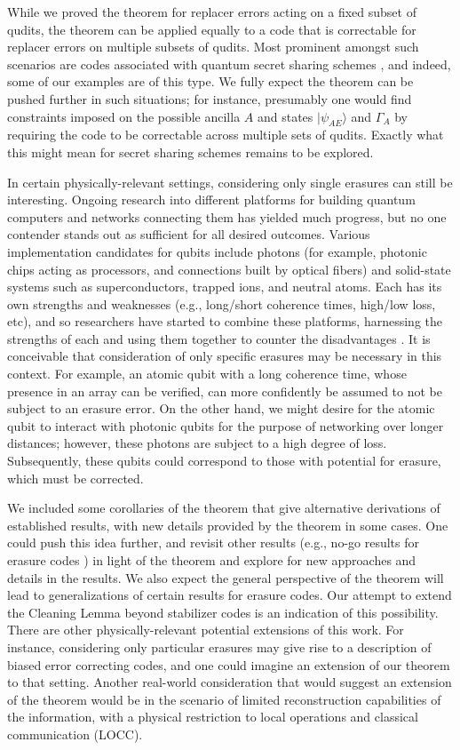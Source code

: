 \documentclass[11pt]{amsart}
\theoremstyle{definition}
\theoremstyle{definition}
\theoremstyle{definition}
\newcommand{\1}{\mathbb{I}}
\def\ket#1{| #1 \rangle}
\begin{document}
While we proved the theorem for replacer errors acting on a fixed subset of qudits, the theorem can be applied equally to a code that is correctable for replacer errors on multiple subsets of qudits. Most prominent amongst such scenarios are codes associated with quantum secret sharing schemes \cite{cleve1999share}, and indeed, some of our examples are of this type. 
We fully expect the theorem can be pushed further in such situations; for instance, presumably one would find constraints imposed on the possible ancilla $A$ and states $\ket{\psi_{AE}}$ and $\Gamma_A$ by requiring the code to be correctable across multiple sets of qudits. Exactly what this might mean for secret sharing schemes remains to be explored.    

In certain physically-relevant settings, considering only single erasures can still be interesting.
Ongoing research into different platforms for building quantum computers and networks connecting them has yielded much progress, but no one contender stands out as sufficient for all
desired outcomes.
Various implementation candidates for qubits include photons (for example, photonic chips acting as processors, and connections built by optical fibers) and solid-state systems such as superconductors, trapped ions, and neutral atoms.
Each has its own strengths and weaknesses (e.g., long/short coherence times, high/low loss, etc), and so researchers have started to combine these platforms, harnessing the strengths of each and using them together to counter the disadvantages \cite{Awshalometal21,Elshaarietal20,Chiaetal24}.
It is conceivable that consideration of only specific erasures may be necessary in this context.
For example, an atomic qubit with a long coherence time, whose presence in an array can be verified, can more confidently be assumed to not be subject to an erasure error.
On the other hand, we might desire for the atomic qubit to interact
with photonic qubits for the purpose of networking over longer distances; however, these photons are subject to a high degree of loss. Subsequently, these qubits could correspond to those with
potential for erasure, which must be corrected.

We included some corollaries of the theorem that give alternative derivations of established results, with new details provided by the theorem in some cases. One could push this idea further, and revisit other results (e.g., no-go results for erasure codes \cite{grassl1997codes}) in light of the theorem and explore for new approaches and details in the results. We also expect the general perspective of the theorem will lead to generalizations of certain results for erasure codes. Our attempt to extend the Cleaning Lemma \cite{Rai98,BT09,Ash20,Preskill_notes} beyond stabilizer codes is an indication of this possibility.  
There are other physically-relevant potential extensions of this work.  
For instance, considering only particular erasures may give rise to a description of biased error correcting codes, and one could imagine an extension of our theorem to that setting. Another real-world consideration that would suggest an extension of the theorem would be in the scenario of limited  reconstruction capabilities of the information, with a physical restriction to local operations and classical communication (LOCC).
\end{document}
